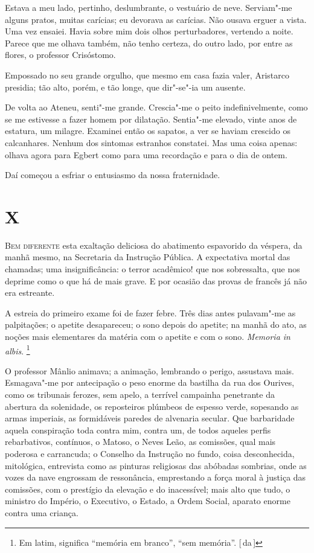 Estava a meu
lado, pertinho, deslumbrante, o vestuário de neve. Serviam"-me alguns
pratos, muitas carícias; eu devorava as carícias. Não ousava erguer a
vista. Uma vez ensaiei. Havia sobre mim dois olhos perturbadores,
vertendo a noite. Parece que me olhava também, não tenho certeza, do
outro lado, por entre as flores, o professor Crisóstomo. 

Empossado no
seu grande orgulho, que mesmo em casa fazia valer, Aristarco presidia;
tão alto, porém, e tão longe, que dir"-se"-ia um ausente. 

De volta ao Ateneu, senti"-me grande. 
Crescia"-me o peito indefinivelmente, 
como se me estivesse a fazer homem por dilatação. 
Sentia"-me elevado, vinte
anos de estatura, um milagre. Examinei então os sapatos, a ver se
haviam crescido os calcanhares. Nenhum dos sintomas estranhos
constatei. Mas uma coisa apenas: olhava agora para Egbert como para uma
recordação e para o dia de ontem. 

Daí começou a esfriar o entusiasmo da nossa fraternidade. 

\section{X}

\noindent\textsc{Bem diferente} esta exaltação deliciosa do abatimento espavorido da
véspera, da manhã mesmo, na Secretaria da Instrução Pública. A
expectativa mortal das chamadas; uma insignificância: o terror
acadêmico! que nos sobressalta, que nos deprime como o que há de mais
grave. E por ocasião das provas de francês já não era estreante. 

A estreia do primeiro exame foi de fazer febre. Três dias antes
pulavam"-me as palpitações; o apetite desapareceu; o sono depois do
apetite; na manhã do ato, as noções mais elementares da matéria com o
apetite e com o sono. \textit{Memoria in albis}.
\footnote{ Em latim, significa ``memória em branco'', ``sem memória''. [\,da\,]} 

O professor Mânlio animava; a
animação, lembrando o perigo, assustava mais. Esmagava"-me por
antecipação o peso enorme da bastilha da rua dos Ourives, como os
tribunais ferozes, sem apelo, a terrível campainha penetrante da
abertura da solenidade, os reposteiros plúmbeos de espesso verde,
sopesando as armas imperiais, as formidáveis paredes de alvenaria
secular. Que barbaridade aquela conspiração toda contra mim, contra um,
de todos aqueles perfis rebarbativos, contínuos, o Matoso, o Neves
Leão, as comissões, qual mais poderosa e carrancuda; o Conselho da
Instrução no fundo, coisa desconhecida, mitológica, entrevista como as
pinturas religiosas das abóbadas sombrias, onde as vozes da nave
engrossam de ressonância, emprestando a força moral à justiça das
comissões, com o prestígio da elevação e do inacessível; mais alto que tudo, 
o ministro do Império, o Executivo, o Estado, a Ordem Social, aparato enorme
contra uma criança. 

